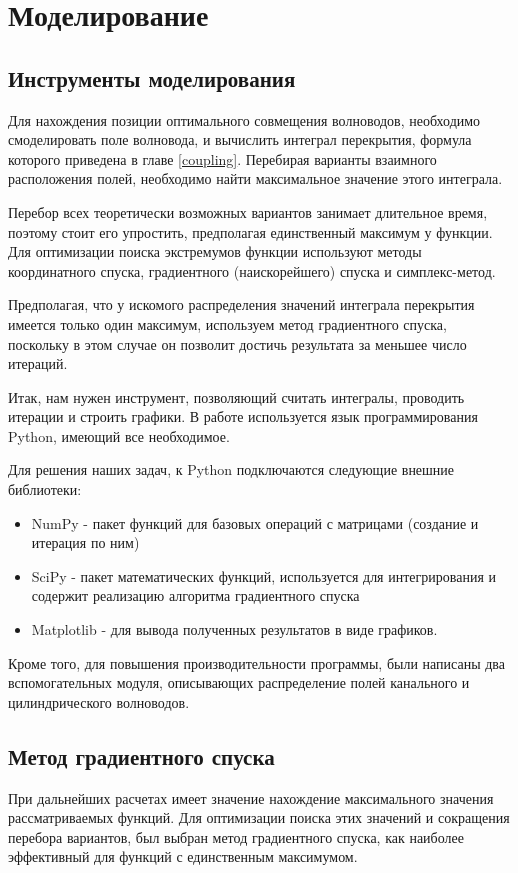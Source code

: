 \chapter{Моделирование}
\section{Инструменты моделирования}
Для нахождения позиции оптимального совмещения волноводов, необходимо смоделировать поле волновода, и вычислить интеграл перекрытия, формула которого приведена в главе \ref{coupling}. Перебирая варианты взаимного расположения полей, необходимо найти максимальное значение этого интеграла.

Перебор всех теоретически возможных вариантов занимает длительное время, поэтому стоит его упростить, предполагая единственный максимум у функции. Для оптимизации поиска экстремумов функции используют методы координатного спуска, градиентного (наискорейшего) спуска и симплекс-метод. \cite{numeric} 

Предполагая, что у искомого распределения значений интеграла перекрытия имеется только один максимум, используем метод градиентного спуска, поскольку в этом случае он позволит достичь результата за меньшее число итераций. \cite{mathews}

Итак, нам нужен инструмент, позволяющий считать интегралы, проводить итерации и строить графики. В работе используется язык программирования Python, имеющий все необходимое. 

Для решения наших задач, к Python подключаются следующие внешние библиотеки:
\begin{itemize}
	\item NumPy - пакет функций для базовых операций с матрицами (создание и итерация по ним)
	\item SciPy - пакет математических функций, используется для интегрирования и содержит реализацию алгоритма градиентного спуска
	\item Matplotlib - для вывода полученных результатов в виде графиков.
\end{itemize}

Кроме того, для повышения производительности программы, были написаны два вспомогательных модуля, описывающих распределение полей канального и цилиндрического волноводов.

\section{Метод градиентного спуска}
При дальнейших расчетах имеет значение нахождение максимального значения рассматриваемых функций.
Для оптимизации поиска этих значений и сокращения перебора вариантов, был выбран метод градиентного спуска, как наиболее эффективный для функций с единственным максимумом. 

